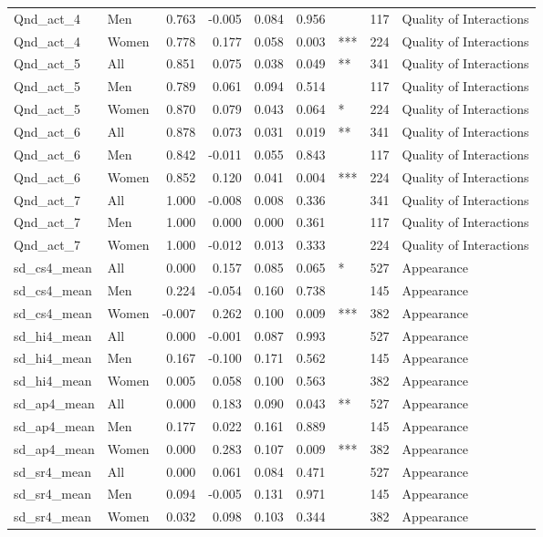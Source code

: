 \begin{table}
\begin{tabular}[t]{llrrrrlrl}
Qnd\_act\_4 & Men & 0.763 & -0.005 & 0.084 & 0.956 &  & 117 & Quality of Interactions\\
Qnd\_act\_4 & Women & 0.778 & 0.177 & 0.058 & 0.003 & *** & 224 & Quality of Interactions\\
Qnd\_act\_5 & All & 0.851 & 0.075 & 0.038 & 0.049 & ** & 341 & Quality of Interactions\\
\addlinespace
Qnd\_act\_5 & Men & 0.789 & 0.061 & 0.094 & 0.514 &  & 117 & Quality of Interactions\\
Qnd\_act\_5 & Women & 0.870 & 0.079 & 0.043 & 0.064 & * & 224 & Quality of Interactions\\
Qnd\_act\_6 & All & 0.878 & 0.073 & 0.031 & 0.019 & ** & 341 & Quality of Interactions\\
Qnd\_act\_6 & Men & 0.842 & -0.011 & 0.055 & 0.843 &  & 117 & Quality of Interactions\\
Qnd\_act\_6 & Women & 0.852 & 0.120 & 0.041 & 0.004 & *** & 224 & Quality of Interactions\\
\addlinespace
Qnd\_act\_7 & All & 1.000 & -0.008 & 0.008 & 0.336 &  & 341 & Quality of Interactions\\
Qnd\_act\_7 & Men & 1.000 & 0.000 & 0.000 & 0.361 &  & 117 & Quality of Interactions\\
Qnd\_act\_7 & Women & 1.000 & -0.012 & 0.013 & 0.333 &  & 224 & Quality of Interactions\\
sd\_cs4\_mean & All & 0.000 & 0.157 & 0.085 & 0.065 & * & 527 & Appearance\\
sd\_cs4\_mean & Men & 0.224 & -0.054 & 0.160 & 0.738 &  & 145 & Appearance\\
\addlinespace
sd\_cs4\_mean & Women & -0.007 & 0.262 & 0.100 & 0.009 & *** & 382 & Appearance\\
sd\_hi4\_mean & All & 0.000 & -0.001 & 0.087 & 0.993 &  & 527 & Appearance\\
sd\_hi4\_mean & Men & 0.167 & -0.100 & 0.171 & 0.562 &  & 145 & Appearance\\
sd\_hi4\_mean & Women & 0.005 & 0.058 & 0.100 & 0.563 &  & 382 & Appearance\\
sd\_ap4\_mean & All & 0.000 & 0.183 & 0.090 & 0.043 & ** & 527 & Appearance\\
\addlinespace
sd\_ap4\_mean & Men & 0.177 & 0.022 & 0.161 & 0.889 &  & 145 & Appearance\\
sd\_ap4\_mean & Women & 0.000 & 0.283 & 0.107 & 0.009 & *** & 382 & Appearance\\
sd\_sr4\_mean & All & 0.000 & 0.061 & 0.084 & 0.471 &  & 527 & Appearance\\
sd\_sr4\_mean & Men & 0.094 & -0.005 & 0.131 & 0.971 &  & 145 & Appearance\\
sd\_sr4\_mean & Women & 0.032 & 0.098 & 0.103 & 0.344 &  & 382 & Appearance\\
\bottomrule
\end{tabular}
\end{table}
